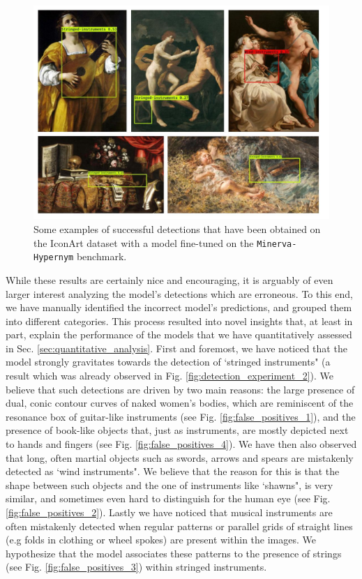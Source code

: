 \begin{figure}[ht!]
\centering
  \includegraphics[width=\linewidth]{./Images/Chapter05/wikiart_detections}
  \caption{Some examples of successful detections that have been obtained on the IconArt dataset with a model fine-tuned on the \texttt{Minerva-Hypernym} benchmark.}
  \label{fig:wikiart_detections}
\end{figure}

While these results are certainly nice and encouraging, it is arguably of even larger interest analyzing the model's detections which are erroneous. To this end, we have manually identified the incorrect model's predictions, and grouped them into different categories. This process resulted into novel insights that, at least in part, explain the performance of the models that we have quantitatively assessed in Sec. \ref{sec:quantitative_analysis}.
First and foremost, we have noticed that the model strongly gravitates towards the detection of `stringed instruments" (a result which was already observed in Fig. \ref{fig:detection_experiment_2}). We believe that such detections are driven by two main reasons: the large presence of dual, conic contour curves of naked women's bodies, which are reminiscent of the resonance box of guitar-like instruments (see Fig. \ref{fig:false_positives_1}), and the presence of book-like objects that, just as instruments, are mostly depicted next to hands and fingers (see Fig. \ref{fig:false_positives_4}). We have then also observed that long, often martial objects such as swords, arrows and spears are mistakenly detected as `wind instruments". We believe that the reason for this is that the shape between such objects and the one of instruments like `shawns", is very similar, and sometimes even hard to distinguish for the human eye (see Fig. \ref{fig:false_positives_2}).
Lastly we have noticed that musical instruments are often mistakenly detected when regular patterns or parallel grids of straight lines (e.g folds in clothing or wheel spokes) are present within the images. We hypothesize that the model associates these patterns to the presence of strings (see Fig. \ref{fig:false_positives_3}) within stringed instruments. 

